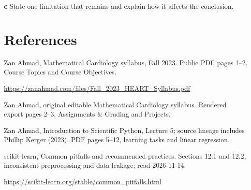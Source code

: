 \documentclass[11pt,letterpaper]{article}
\theoremstyle{definition}\newtheorem{definition}{Definition}\newtheorem{example}{Example}
\numberwithin{equation}{section}
\begin{document}
\textbf{c} State one limitation that remains and explain how it affects the conclusion.

\section*{References}
\noindent\begin{minipage}{\linewidth}
Zan Ahmad, Mathematical Cardiology syllabus, Fall 2023. Public PDF pages 1--2, Course Topics and Course Objectives.

\url{https://zanahmad.com/files/Fall_2023_HEART_Syllabus.pdf}
\end{minipage}\par\medskip
\noindent\begin{minipage}{\linewidth}
Zan Ahmad, original editable Mathematical Cardiology syllabus. Rendered export pages 2--3, Assignments \& Grading and Projects.

\end{minipage}\par\medskip
\noindent\begin{minipage}{\linewidth}
Zan Ahmad, Introduction to Scientific Python, Lecture 5; source lineage includes Phillip Kerger (2023). PDF pages 5--12, learning tasks and linear regression.

\end{minipage}\par\medskip
\noindent\begin{minipage}{\linewidth}
scikit-learn, Common pitfalls and recommended practices. Sections 12.1 and 12.2, inconsistent preprocessing and data leakage; read 2026-11-14.

\url{https://scikit-learn.org/stable/common_pitfalls.html}
\end{minipage}\par\medskip
\end{document}

